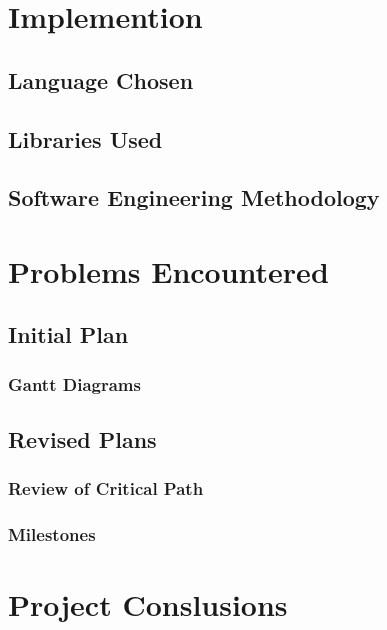 \documentclass[a4paper,12pt]{report}
\begin{document}



\chapter{Implemention}

\section{Language Chosen}



\section{Libraries Used}



\section{Software Engineering Methodology}




\chapter{Problems Encountered}

\section{Initial Plan}

\subsection{Gantt Diagrams}

\section{Revised Plans}

\subsection{Review of Critical Path}

\subsection{Milestones}


\chapter{Project Conslusions}
\end{document}
